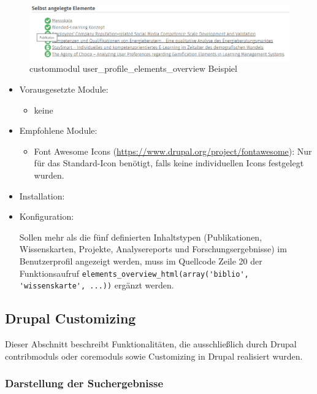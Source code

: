 \begin{figure}[H]
	\centering
	\includegraphics[width=0.80\linewidth]{images/example_userprofile}
	\caption{\gls{custommodul} user\_profile\_elements\_overview Beispiel}
	\label{fig:example_userprofile}
\end{figure}

\begin{itemize}[parsep=0pt, itemsep=5.0pt plus 2.0pt minus 1.0pt, leftmargin=*]
	\item Vorausgesetzte Module:
	\begin{itemize}
		\item keine
	\end{itemize}

	\item Empfohlene Module:
	\begin{itemize}
		\item Font Awesome Icons (\url{https://www.drupal.org/project/fontawesome}): Nur für das Standard-Icon benötigt, falls keine individuellen Icons festgelegt wurden.
	\end{itemize}

	\item Installation: \standardinstall


	\item Konfiguration:

	\noconfig

	Sollen mehr als die fünf definierten Inhaltstypen (Publikationen, Wissenskarten, Projekte, Analysereports und Forschungsergebnisse) im Benutzerprofil angezeigt werden, muss im Quellcode Zeile 20 der Funktionsaufruf \lstinline|elements_overview_html(array('biblio', 'wissenskarte', ...))| ergänzt werden.
\end{itemize}



\newpage
\subsection{Drupal Customizing}\label{sub:drupal_customizing}
Dieser Abschnitt beschreibt Funktionalitäten, die ausschließlich durch Drupal \glspl{contribmodul} oder \glspl{coremodul} sowie Customizing in Drupal realisiert wurden.

\subsubsection{Darstellung der Suchergebnisse}\label{subsub:suchergebnisse}


